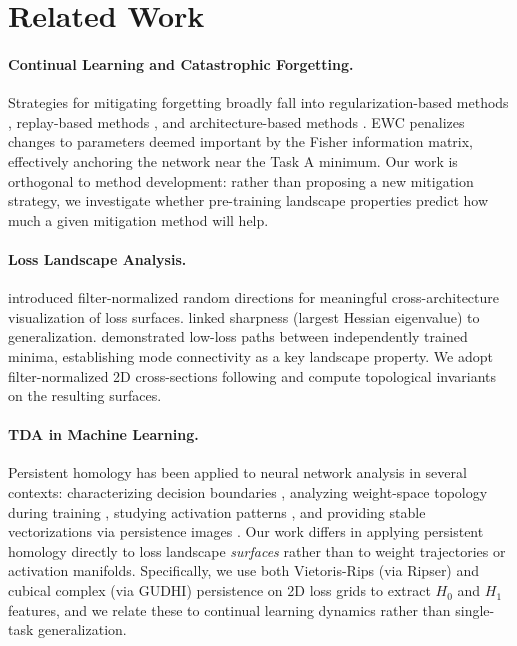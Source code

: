 \documentclass[10pt,twocolumn]{article}
\begin{document}
\section{Related Work}
\label{sec:related}

\paragraph{Continual Learning and Catastrophic Forgetting.}
Strategies for mitigating forgetting broadly fall into regularization-based methods \citep{kirkpatrick2017overcoming, zenke2017continual}, replay-based methods \citep{rebuffi2017icarl, shin2017continual}, and architecture-based methods \citep{rusu2016progressive, mallya2018packnet}. EWC \citep{kirkpatrick2017overcoming} penalizes changes to parameters deemed important by the Fisher information matrix, effectively anchoring the network near the Task A minimum. Our work is orthogonal to method development: rather than proposing a new mitigation strategy, we investigate whether pre-training landscape properties predict how much a given mitigation method will help.

\paragraph{Loss Landscape Analysis.}
\citet{li2018visualizing} introduced filter-normalized random directions for meaningful cross-architecture visualization of loss surfaces. \citet{keskar2017on} linked sharpness (largest Hessian eigenvalue) to generalization. \citet{garipov2018loss} demonstrated low-loss paths between independently trained minima, establishing mode connectivity as a key landscape property. We adopt filter-normalized 2D cross-sections following \citet{li2018visualizing} and compute topological invariants on the resulting surfaces.

\paragraph{TDA in Machine Learning.}
Persistent homology has been applied to neural network analysis in several contexts: characterizing decision boundaries \citep{ramamurthy2019topological}, analyzing weight-space topology during training \citep{rieck2019neural}, studying activation patterns \citep{naitzat2020topology}, and providing stable vectorizations via persistence images \citep{adams2017persistence}. Our work differs in applying persistent homology directly to loss landscape \emph{surfaces} rather than to weight trajectories or activation manifolds. Specifically, we use both Vietoris-Rips (via Ripser) and cubical complex (via GUDHI) persistence on 2D loss grids to extract $H_0$ and $H_1$ features, and we relate these to continual learning dynamics rather than single-task generalization.
\end{document}
